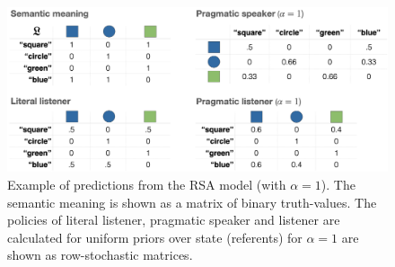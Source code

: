 \documentclass[fleqn]{article}
\begin{document}
\begin{figure}[t]
  \centering
  \includegraphics[width = 0.9 \textwidth]{00-pics/RSA-example.png}
  \caption{
    Example of predictions from the RSA model (with $\alpha=1$).
    The semantic meaning is shown as a matrix of binary truth-values.
    The policies of literal listener, pragmatic speaker and listener are calculated for uniform priors over state (referents) for $\alpha=1$ are shown as row-stochastic matrices.
  }
  \label{fig:RSA-example}
\end{figure}
\end{document}
